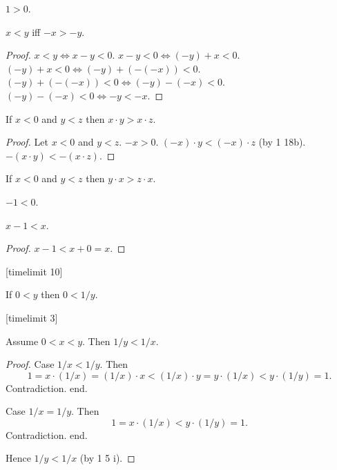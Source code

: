 \documentclass{article}
\begin{document}
\begin{forthel}
\begin{proposition}[1 18 dd]
$1 > 0$.
\end{proposition}

\begin{proposition}
$x < y$ iff $-x > -y$.
\end{proposition}
\begin{proof}
$x < y \iff x - y < 0$.
$x - y < 0 \iff (-y) + x < 0$.
$(-y) + x < 0 \iff (-y)+(-(-x)) < 0$.
$(-y)+(-(-x)) < 0 \iff (-y)-(-x) < 0$.
$(-y)-(-x) < 0 \iff -y < -x$.
\end{proof}

\begin{proposition}[1 18 c]
If $x < 0$ and $y < z$ then
$x \cdot y > x \cdot z$.
\end{proposition}
\begin{proof}
Let $x < 0$ and $y < z$.
$-x > 0$.
$(-x)\cdot y < (-x)\cdot z$ (by 1 18b).
$-(x\cdot y) < -(x\cdot z)$.
\end{proof}

\begin{proposition}[1 18 cc]
If $x < 0$ and $y < z$ then
$y \cdot x > z \cdot x$.
\end{proposition}

\begin{proposition}
$-1 < 0$.
\end{proposition}

\begin{proposition}
$x - 1 < x$.
\end{proposition}
\begin{proof}
$x - 1 < x + 0 = x$.
\end{proof}
[timelimit 10]
\begin{proposition}[1 18 e]
If $0 < y$ then $0 < 1/y$.
\end{proposition}
[timelimit 3]
\begin{proposition}[1 18 ee]
Assume $0 < x < y$.
Then $1/y < 1/x$.
\end{proposition}
\begin{proof}
Case $1/x < 1/y$.
Then
\[ 1 = x \cdot (1/x) = (1/x) \cdot x < (1/x) \cdot y =
y \cdot (1/x) < y \cdot (1/y) = 1. \]
Contradiction. end.

Case $1/x = 1/y$. Then
\[ 1 = x \cdot (1/x) < y \cdot (1/y) = 1. \]
Contradiction. end.

Hence $1/y < 1/x$ (by 1 5 i).
\end{proof}

\end{forthel}
\end{document}
